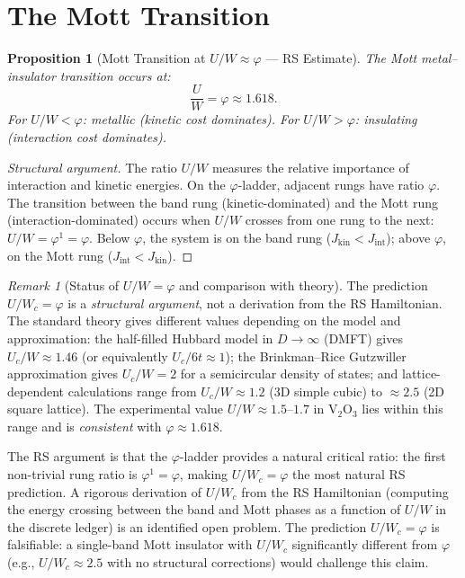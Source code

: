 \documentclass[12pt,a4paper]{article}
\newtheorem{proposition}[theorem]{Proposition}
\theoremstyle{definition}
\theoremstyle{remark}
\newtheorem{remark}[theorem]{Remark}
\begin{document}
\section{The Mott Transition}
\label{sec:mott}

\begin{proposition}[Mott Transition at $U/W \approx \varphi$ --- RS Estimate]
\label{thm:mott}
The Mott metal--insulator transition occurs at:
\begin{equation}
  \boxed{\frac{U}{W} = \varphi \approx 1.618.}
\end{equation}
For $U/W < \varphi$: metallic (kinetic cost dominates).
For $U/W > \varphi$: insulating (interaction cost dominates).
\end{proposition}

\begin{proof}[Structural argument]
The ratio $U/W$ measures the relative importance of interaction
and kinetic energies.  On the $\varphi$-ladder, adjacent rungs
have ratio $\varphi$.  The transition between the band rung
(kinetic-dominated) and the Mott rung (interaction-dominated)
occurs when $U/W$ crosses from one rung to the next:
$U/W = \varphi^1 = \varphi$.  Below $\varphi$, the system is on
the band rung ($J_{\mathrm{kin}} < J_{\mathrm{int}}$); above
$\varphi$, on the Mott rung ($J_{\mathrm{int}} <
J_{\mathrm{kin}}$).
\end{proof}

\begin{remark}[Status of $U/W = \varphi$ and comparison with theory]
\label{rem:mott-status}
The prediction $U/W_c = \varphi$ is a \emph{structural argument},
not a derivation from the RS Hamiltonian.  The standard theory
gives different values depending on the model and approximation:
the half-filled Hubbard model in $D \to \infty$ (DMFT) gives
$U_c/W \approx 1.46$ (or equivalently $U_c/6t \approx 1$); the
Brinkman--Rice Gutzwiller approximation gives $U_c/W = 2$ for a
semicircular density of states; and lattice-dependent calculations
range from $U_c/W \approx 1.2$ (3D simple cubic) to $\approx 2.5$
(2D square lattice).  The experimental value $U/W \approx 1.5$--$1.7$
in V$_2$O$_3$ lies within this range and is \emph{consistent} with
$\varphi \approx 1.618$.

The RS argument is that the $\varphi$-ladder provides a natural
critical ratio: the first non-trivial rung ratio is $\varphi^1
= \varphi$, making $U/W_c = \varphi$ the most natural RS
prediction.  A rigorous derivation of $U/W_c$ from the RS
Hamiltonian (computing the energy crossing between the band and
Mott phases as a function of $U/W$ in the discrete ledger) is an
identified open problem.  The prediction $U/W_c = \varphi$ is
falsifiable: a single-band Mott insulator with $U/W_c$
significantly different from $\varphi$ (e.g., $U/W_c \approx 2.5$
with no structural corrections) would challenge this claim.
\end{remark}
\end{document}
